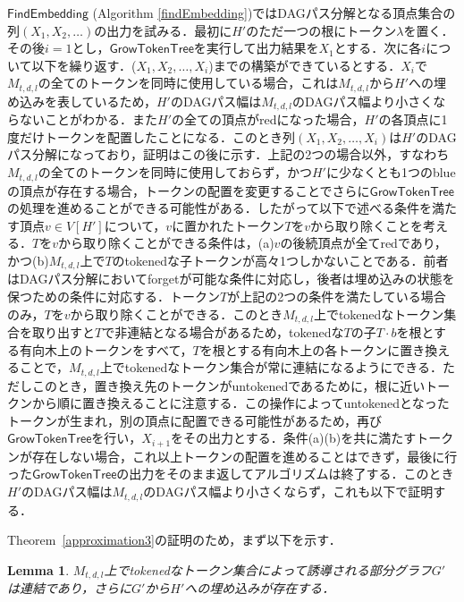 \documentclass[master]{kuisthesis}		%
\theoremstyle{plain}
\newtheorem{lemma}{Lemma}
\theoremstyle{definition}
\begin{document}
$\mathsf{FindEmbedding}$ (Algorithm \ref{findEmbedding})ではDAGパス分解となる頂点集合の列$(X_1, X_2, \dots)$の出力を試みる．最初に$H'$のただ一つの根にトークン$\lambda$を置く．その後$i=1$とし，$\mathsf{GrowTokenTree}$を実行して出力結果を$X_1$とする．次に各$i$について以下を繰り返す．($X_1, X_2,  \dots , X_i$)までの構築ができているとする．$X_i$で$M_{t, d, l}$の全てのトークンを同時に使用している場合，これは$M_{t, d, l}$から$H'$への埋め込みを表しているため，$H'$のDAGパス幅は$M_{t, d, l}$のDAGパス幅より小さくならないことがわかる．また$H'$の全ての頂点がredになった場合，$H'$の各頂点に1度だけトークンを配置したことになる．このとき列$(X_1, X_2, \dots, X_i)$は$H'$のDAGパス分解になっており，証明はこの後に示す．上記の2つの場合以外，すなわち$M_{t, d, l}$の全てのトークンを同時に使用しておらず，かつ$H'$に少なくとも1つのblueの頂点が存在する場合，トークンの配置を変更することでさらに$\mathsf{GrowTokenTree}$の処理を進めることができる可能性がある．したがって以下で述べる条件を満たす頂点$v \in V[H']$について，$v$に置かれたトークン$T$を$v$から取り除くことを考える．$T$を$v$から取り除くことができる条件は，(a)$v$の後続頂点が全てredであり，かつ(b)$M_{t, d, l}$上で$T$のtokenedな子トークンが高々1つしかないことである．前者はDAGパス分解においてforgetが可能な条件に対応し，後者は埋め込みの状態を保つための条件に対応する．トークン$T$が上記の2つの条件を満たしている場合のみ，$T$を$v$から取り除くことができる．このとき$M_{t, d, l}$上でtokenedなトークン集合を取り出すと$T$で非連結となる場合があるため，tokenedな$T$の子$T\cdot b$を根とする有向木上のトークンをすべて，$T$を根とする有向木上の各トークンに置き換えることで，$M_{t, d, l}$上でtokenedなトークン集合が常に連結になるようにできる．ただしこのとき，置き換え先のトークンがuntokenedであるために，根に近いトークンから順に置き換えることに注意する．この操作によってuntokenedとなったトークンが生まれ，別の頂点に配置できる可能性があるため，再び$\mathsf{GrowTokenTree}$を行い，$X_{i+1}$をその出力とする．条件(a)(b)を共に満たすトークンが存在しない場合，これ以上トークンの配置を進めることはできず，最後に行った$\mathsf{GrowTokenTree}$の出力をそのまま返してアルゴリズムは終了する．このとき$H'$のDAGパス幅は$M_{t, d, l}$のDAGパス幅より小さくならず，これも以下で証明する．

Theorem~\ref{approximation3}の証明のため，まず以下を示す．

\begin{lemma}\label{lemma_embedding}
    $M_{t, d, l}$上でtokenedなトークン集合によって誘導される部分グラフ$G'$は連結であり，さらに$G'$から$H'$への埋め込みが存在する．
\end{lemma}
\end{document}
